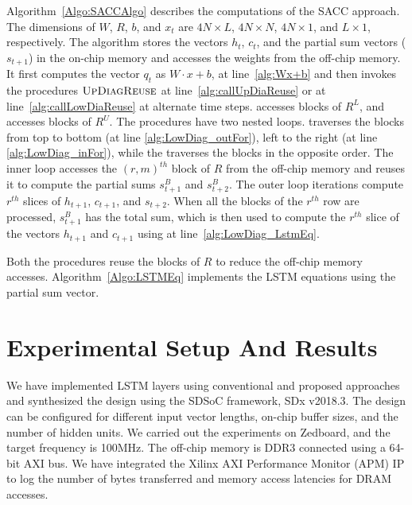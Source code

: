 Algorithm~\ref{Algo:SACCAlgo} describes the computations of the SACC approach. The dimensions of $W$, $R$, $b$, and $x_t$ are $4N{\times}L$, $4N{\times}N$, $4N{\times}1$, and $L{\times}1$, respectively. The algorithm stores the vectors $h_t$, $c_t$, and the partial sum vectors ($s_{t+1}$) in the on-chip memory and accesses the weights from the off-chip memory. It first computes the vector $q_t$ as $W{\cdot}x{+}b$, at line~\ref{alg:Wx+b} and then invokes the procedures $\textproc{UpDiagReuse}$ at line~\ref{alg:callUpDiaReuse} or   at line~\ref{alg:callLowDiaReuse} at alternate time steps.  accesses blocks of $R^L$, and  accesses blocks of $R^U$. The procedures have two nested loops.  traverses the blocks from top to bottom (at line \ref{alg:LowDiag_outFor}), left to the right (at line \ref{alg:LowDiag_inFor}), while the  traverses the blocks in the opposite order. The inner loop accesses the $(r,m)^{th}$ block of $R$ from the off-chip memory and reuses it to compute the partial sums $s^B_{t+1}$ and $s^B_{t+2}$. The outer loop iterations compute $r^{th}$ slices of $h_{t+1}$, $c_{t+1}$, and $s_{t+2}$.
When all the blocks of the $r^{th}$ row are processed, $s^B_{t+1}$ has the total sum, which is then used to compute the $r^{th}$ slice of the vectors $h_{t+1}$ and $c_{t+1}$ using  at line~\ref{alg:LowDiag_LstmEq}. 

Both the procedures reuse the blocks of $R$ to reduce the off-chip memory accesses. Algorithm~\ref{Algo:LSTMEq} implements the LSTM equations using the partial sum vector.
\section{Experimental Setup And Results}
We have implemented LSTM layers using conventional and proposed approaches and synthesized the design using the SDSoC framework, SDx v2018.3. The design can be configured for different input vector lengths, on-chip buffer sizes, and the number of hidden units. We carried out the experiments on Zedboard, and the target frequency is 100MHz.  The off-chip memory is DDR3 connected using a 64-bit AXI bus. We have integrated the Xilinx AXI Performance Monitor (APM) IP to log the number of bytes transferred and memory access latencies for DRAM accesses.

